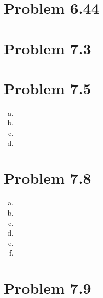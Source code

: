 \documentclass[11pt]{article}
\numberwithin{equation}{section}
\begin{document}


\section{Problem 6.44}

\section{Problem 7.3}

\section{Problem 7.5}
\begin{enumerate}[(a)]
\item
\item
\item
\item
\end{enumerate}

\section{Problem 7.8}
\begin{enumerate}[(a)]
\item
\item
\item
\item
\item
\item
\end{enumerate}

\section{Problem 7.9}
\end{document}
